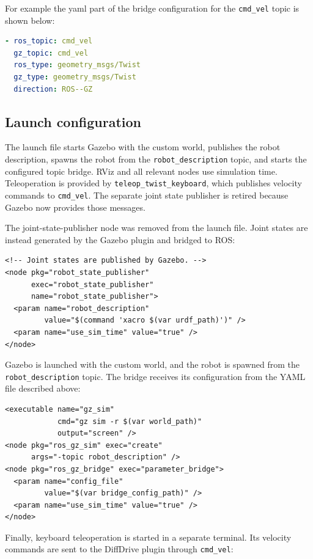 \documentclass[10pt,a4paper]{article}
\begin{document}
For example the yaml part of the bridge configuration for the \texttt{cmd\_vel} topic is shown below:

\begin{lstlisting}[language=YAML]
- ros_topic: cmd_vel
  gz_topic: cmd_vel
  ros_type: geometry_msgs/Twist
  gz_type: geometry_msgs/Twist
  direction: ROS--GZ
\end{lstlisting}

\subsection{Launch configuration}

The launch file starts Gazebo with the custom world, publishes the robot
description, spawns the robot from the \texttt{robot\_description} topic, and
starts the configured topic bridge.  RViz and all relevant nodes use simulation
time.  Teleoperation is provided by \texttt{teleop\_twist\_keyboard}, which
publishes velocity commands to \texttt{cmd\_vel}.  The separate joint state
publisher is retired because Gazebo now provides those messages.

The joint-state-publisher node was removed from the launch file.  Joint states
are instead generated by the Gazebo plugin and bridged to ROS:

\begin{lstlisting}[language=XACRO]
<!-- Joint states are published by Gazebo. -->
<node pkg="robot_state_publisher"
      exec="robot_state_publisher"
      name="robot_state_publisher">
  <param name="robot_description"
         value="$(command 'xacro $(var urdf_path)')" />
  <param name="use_sim_time" value="true" />
</node>
\end{lstlisting}

Gazebo is launched with the custom world, and the robot is spawned from the
\texttt{robot\_description} topic.  The bridge receives its configuration from
the YAML file described above:

\begin{lstlisting}[language=XACRO]
<executable name="gz_sim"
            cmd="gz sim -r $(var world_path)"
            output="screen" />
<node pkg="ros_gz_sim" exec="create"
      args="-topic robot_description" />
<node pkg="ros_gz_bridge" exec="parameter_bridge">
  <param name="config_file"
         value="$(var bridge_config_path)" />
  <param name="use_sim_time" value="true" />
</node>
\end{lstlisting}

Finally, keyboard teleoperation is started in a separate terminal.  Its
velocity commands are sent to the DiffDrive plugin through \texttt{cmd\_vel}:
\end{document}
